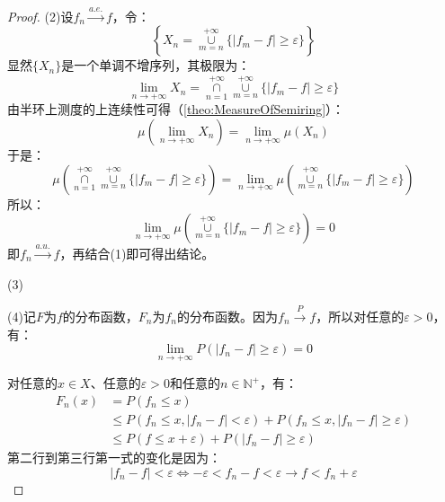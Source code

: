 \begin{proof}
	(2)设$f_n\overset{a.e.}{\longrightarrow}f$，令：
	\begin{equation*}
		\left\{X_n=\underset{m=n}{\overset{+\infty}{\cup}}\{|f_m-f|\geqslant\varepsilon\}\right\}
	\end{equation*}
	显然$\{X_n\}$是一个单调不增序列，其极限为：
	\begin{equation*}
		\lim_{n\to+\infty}X_n=\underset{n=1}{\overset{+\infty}{\cap}}\underset{m=n}{\overset{+\infty}{\cup}}\{|f_m-f|\geqslant\varepsilon\}
	\end{equation*}
	由半环上测度的上连续性可得（\cref{theo:MeasureOfSemiring}）：
	\begin{equation*}
		\mu\left(\lim_{n\to+\infty}X_n\right)=\lim_{n\to+\infty}\mu(X_n)
	\end{equation*}
	于是：
	\begin{equation*}
		\mu\left(\underset{n=1}{\overset{+\infty}{\cap}}\underset{m=n}{\overset{+\infty}{\cup}}\{|f_m-f|\geqslant\varepsilon\}\right)=\lim_{n\to+\infty}\mu\left(\underset{m=n}{\overset{+\infty}{\cup}}\{|f_m-f|\geqslant\varepsilon\}\right)
	\end{equation*}
	所以：
	\begin{equation*}
		\lim_{n\to+\infty}\mu\left(\underset{m=n}{\overset{+\infty}{\cup}}\{|f_m-f|\geqslant\varepsilon\}\right)=0
	\end{equation*}
	即$f_n\overset{a.u.}{\longrightarrow}f$，再结合(1)即可得出结论。\par
	(3)\par
	(4)记$F$为$f$的分布函数，$F_n$为$f_n$的分布函数。因为$f_n\overset{P}{\longrightarrow}f$，所以对任意的$\varepsilon>0$，有：
	\begin{equation*}
		\lim_{n\to+\infty}P(|f_n-f|\geqslant\varepsilon)=0
	\end{equation*}\par
	对任意的$x\in X$、任意的$\varepsilon>0$和任意的$n\in \mathbb{N}^+$，有：
	\begin{align*}
		F_n(x)&=P(f_n\leqslant x) \\
		&\leqslant P(f_n\leqslant x,|f_n-f|<\varepsilon)+P(f_n\leqslant x,|f_n-f|\geqslant\varepsilon) \\
		&\leqslant P(f\leqslant x+\varepsilon)+P(|f_n-f|\geqslant\varepsilon)
	\end{align*}
	第二行到第三行第一式的变化是因为：
	\begin{equation*}
		|f_n-f|<\varepsilon\Leftrightarrow-\varepsilon<f_n-f<\varepsilon\rightarrow f<f_n+\varepsilon
	\end{equation*}

\end{proof}
